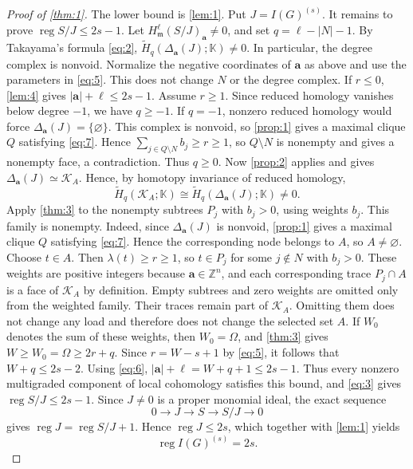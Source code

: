 \documentclass[11pt]{amsart}
\theoremstyle{definition}
\newcommand{\reg}{\operatorname{reg}}
\newcommand{\m}{\mathfrak m}
\newcommand{\ZZ}{\mathbb Z}
\newcommand{\kk}{\mathbb K}
\begin{document}
\begin{proof}[Proof of \cref{thm:1}]
The lower bound is \cref{lem:1}. Put $J=I(G)^{(s)}$. It remains to prove $\reg S/J\le2s-1$. Let $H^\ell_{\m}(S/J)_{\mathbf a}\ne0$, and set $q=\ell-|N|-1$. By Takayama's formula \cref{eq:2}, $\widetilde H_q(\Delta_{\mathbf a}(J);\kk)\ne0$. In particular, the degree complex is nonvoid. Normalize the negative coordinates of $\mathbf a$ as above and use the parameters in \cref{eq:5}. This does not change $N$ or the degree complex. If $r\le0$, \cref{lem:4} gives $|\mathbf a|+\ell\le2s-1$. Assume $r\ge1$. Since reduced homology vanishes below degree $-1$, we have $q\ge-1$. If $q=-1$, nonzero reduced homology would force $\Delta_{\mathbf a}(J)=\{\varnothing\}$. This complex is nonvoid, so \cref{prop:1} gives a maximal clique $Q$ satisfying \cref{eq:7}. Hence $\sum_{j\in Q\setminus N} b_j\ge r\ge1$, so $Q\setminus N$ is nonempty and gives a nonempty face, a contradiction. Thus $q\ge0$. Now \cref{prop:2} applies and gives $\Delta_{\mathbf a}(J)\simeq\mathcal K_A$. Hence, by homotopy invariance of reduced homology,
\[
\widetilde H_q(\mathcal K_A;\kk)\cong\widetilde H_q(\Delta_{\mathbf a}(J);\kk)\ne0.
\]
Apply \cref{thm:3} to the nonempty subtrees $P_j$ with $b_j>0$, using weights $b_j$. This family is nonempty. Indeed, since $\Delta_{\mathbf a}(J)$ is nonvoid, \cref{prop:1} gives a maximal clique $Q$ satisfying \cref{eq:7}. Hence the corresponding node belongs to $A$, so $A\ne\varnothing$. Choose $t\in A$. Then $\lambda(t)\ge r\ge1$, so $t\in P_j$ for some $j\notin N$ with $b_j>0$. These weights are positive integers because $\mathbf a\in\ZZ^n$, and each corresponding trace $P_j\cap A$ is a face of $\mathcal K_A$ by definition. Empty subtrees and zero weights are omitted only from the weighted family. Their traces remain part of $\mathcal K_A$. Omitting them does not change any load and therefore does not change the selected set $A$. If $W_0$ denotes the sum of these weights, then $W_0=\Omega$, and \cref{thm:3} gives $W\ge W_0=\Omega\ge2r+q$. Since $r=W-s+1$ by \cref{eq:5}, it follows that $W+q\le2s-2$. Using \cref{eq:6}, $|\mathbf a|+\ell=W+q+1\le2s-1$. Thus every nonzero multigraded component of local cohomology satisfies this bound, and \cref{eq:3} gives $\reg S/J\le2s-1$. Since $J\ne0$ is a proper monomial ideal, the exact sequence
\[
0\longrightarrow J\longrightarrow S\longrightarrow S/J\longrightarrow0
\]
gives $\reg J=\reg S/J+1$. Hence $\reg J\le2s$, which together with \cref{lem:1} yields
\[
\reg I(G)^{(s)}=2s.
\]
\end{proof}
\end{document}
